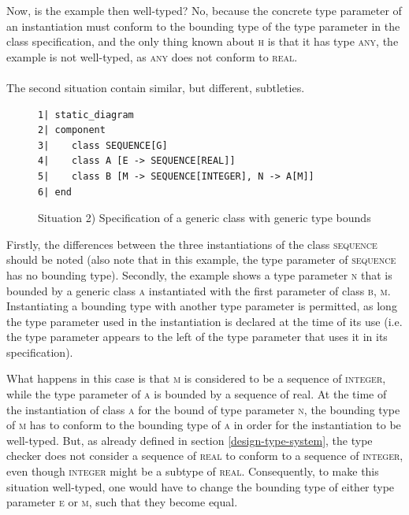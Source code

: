 Now, is the example then well-typed? No, because the concrete type parameter of an instantiation must conform to the bounding type of the type parameter in the class specification, and the only thing known about \textsc{h} is that it has type \textsc{any}, the example is not well-typed, as \textsc{any} does not conform to \textsc{real}.
\paragraph{} The second situation contain similar, but different, subtleties.
\begin{figure}[H]
{\footnotesize
\begin{verbatim}
1| static_diagram
2| component
3|    class SEQUENCE[G]
4|    class A [E -> SEQUENCE[REAL]]
5|    class B [M -> SEQUENCE[INTEGER], N -> A[M]] 
6| end
\end{verbatim}
}
\caption{Situation 2) Specification of a generic class with generic type bounds}
\label{fig:generic_type_bounds}
\end{figure}
Firstly, the differences between the three instantiations of the class \textsc{sequence} should be noted (also note that in this example, the type parameter of \textsc{sequence} has no bounding type). Secondly, the example shows a type parameter \textsc{n} that is bounded by a generic class \textsc{a} instantiated with the first parameter of class \textsc{b},  \textsc{m}. Instantiating a bounding type with another type parameter is permitted, as long the type parameter used in the instantiation is declared at the time of its use (i.e. the type parameter appears to the left of the type parameter that uses it in its specification).

What happens in this case is that \textsc{m} is considered to be a sequence of \textsc{integer}, while the type parameter of \textsc{a} is bounded by a sequence of {real}. At the time of the instantiation of class \textsc{a} for the bound of type parameter \textsc{n}, the bounding type of \textsc{m} has to conform to the bounding type of \textsc{a} in order for the instantiation to be well-typed. But, as already defined in section \ref{design-type-system}, the type checker does not consider a sequence of \textsc{real} to conform to a sequence of \textsc{integer}, even though \textsc{integer} might be a subtype of \textsc{real}. Consequently, to make this situation well-typed, one would have to change the bounding type of either type parameter \textsc{e} or \textsc{m}, such that they become equal.

